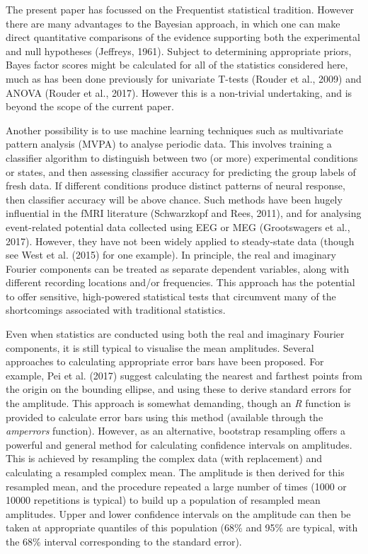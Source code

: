 \documentclass[]{article}
\begin{document}
The present paper has focussed on the Frequentist statistical tradition. However there are many advantages to the Bayesian approach, in which one can make direct quantitative comparisons of the evidence supporting both the experimental and null hypotheses (Jeffreys, 1961). Subject to determining appropriate priors, Bayes factor scores might be calculated for all of the statistics considered here, much as has been done previously for univariate T-tests (Rouder et al., 2009) and ANOVA (Rouder et al., 2017). However this is a non-trivial undertaking, and is beyond the scope of the current paper.

Another possibility is to use machine learning techniques such as multivariate pattern analysis (MVPA) to analyse periodic data. This involves training a classifier algorithm to distinguish between two (or more) experimental conditions or states, and then assessing classifier accuracy for predicting the group labels of fresh data. If different conditions produce distinct patterns of neural response, then classifier accuracy will be above chance. Such methods have been hugely influential in the fMRI literature (Schwarzkopf and Rees, 2011), and for analysing event-related potential data collected using EEG or MEG (Grootswagers et al., 2017). However, they have not been widely applied to steady-state data (though see West et al. (2015) for one example). In principle, the real and imaginary Fourier components can be treated as separate dependent variables, along with different recording locations and/or frequencies. This approach has the potential to offer sensitive, high-powered statistical tests that circumvent many of the shortcomings associated with traditional statistics.

Even when statistics are conducted using both the real and imaginary Fourier components, it is still typical to visualise the mean amplitudes. Several approaches to calculating appropriate error bars have been proposed. For example, Pei et al. (2017) suggest calculating the nearest and farthest points from the origin on the bounding ellipse, and using these to derive standard errors for the amplitude. This approach is somewhat demanding, though an \emph{R} function is provided to calculate error bars using this method (available through the \emph{amperrors} function). However, as an alternative, bootstrap resampling offers a powerful and general method for calculating confidence intervals on amplitudes. This is achieved by resampling the complex data (with replacement) and calculating a resampled complex mean. The amplitude is then derived for this resampled mean, and the procedure repeated a large number of times (1000 or 10000 repetitions is typical) to build up a population of resampled mean amplitudes. Upper and lower confidence intervals on the amplitude can then be taken at appropriate quantiles of this population (68\% and 95\% are typical, with the 68\% interval corresponding to the standard error).
\end{document}
